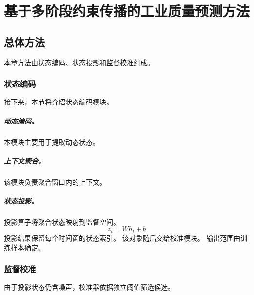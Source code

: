 \chapter{基于多阶段约束传播的工业质量预测方法}
\section{总体方法}
本章方法由状态编码、状态投影和监督校准组成。
\subsection{状态编码}
接下来，本节将介绍状态编码模块。
\paragraph{动态编码。}
本模块主要用于提取动态状态。
\paragraph{上下文聚合。}
该模块负责聚合窗口内的上下文。
\paragraph{状态投影。}
投影算子将聚合状态映射到监督空间。
\begin{equation}
z_t = W h_t + b
\end{equation}
投影结果保留每个时间窗的状态索引。
该对象随后交给校准模块。
输出范围由训练样本确定。
\subsection{监督校准}
由于投影状态仍含噪声，校准器依据独立阈值筛选候选。
